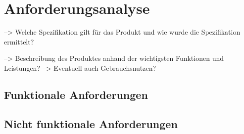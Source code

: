 \chapter{Anforderungsanalyse} \label{anforderungsanalyse}

--> Welche Spezifikation gilt für das Produkt und wie wurde die Spezifikation ermittelt?

--> Beschreibung des Produktes anhand der wichtigsten Funktionen und Leistungen? --> Eventuell auch Gebrauchsnutzen?

\section{Funktionale Anforderungen} \label{anf:Funktional}



\section{Nicht funktionale Anforderungen} \label{anf:NichtFunktional}





